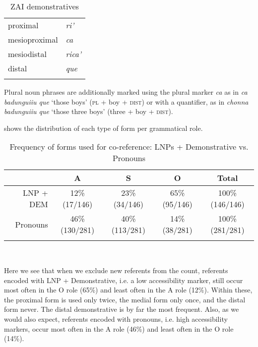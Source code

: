 \begin{table}  

\caption{{ZAI demonstratives}}
\begin{tabular}{ l  l }
\lsptoprule
 {proximal} & \textit{ri'} \\

 
 {mesioproximal} & \textit{ca} \\

 
 {mesiodistal} & \textit{rica'} \\

 
 {distal} & \textit{que} \\

\lspbottomrule
\end{tabular}
\label{zdmn}

\end{table}
Plural noun phrases are additionally marked using the plural marker \textit{ca} as in \textit{ca badunguiiu que} `those boys' (\textsc{pl} + boy + \textsc{dist}) or with a quantifier, as in \textit{chonna badunguiiu que} `those three boys' (three + boy + \textsc{dist}).

 shows the distribution of each type of form per grammatical role.

\begin{table}

\caption{{Frequency of forms used for co-reference: LNPs + Demonstrative vs. Pronouns}}
\begin{tabular}{ r  c  c  c  c }
\lsptoprule
 & \textsc{A} & \textsc{S} & \textsc{O} & Total\\

\midrule
LNP + DEM & 12{\%} (17/146) & 23{\%} (34/146) & 65{\%} (95/146) & 100{\%} (146/146)  \\

 
Pronouns & 46{\%} (130/281) & 40{\%} (113/281) & 14{\%} (38/281) & 100{\%} (281/281)  \\

\lspbottomrule
\end{tabular}\\
\label{coreferenceforms}

\end{table}
Here we see that when we exclude new referents from the count, referents encoded with LNP + Demonstrative, i.e. a low accessibility marker, still occur most often in the O role (65{\%}) and least often in the A role (12{\%}). Within these, the proximal form is used only twice, the medial form only once, and the distal form never. The distal demonstrative is by far the most frequent. Also, as we would also expect, referents encoded with pronouns, i.e. high accessibility markers, occur most often in the A role (46{\%}) and least often in the O role (14{\%}). 

